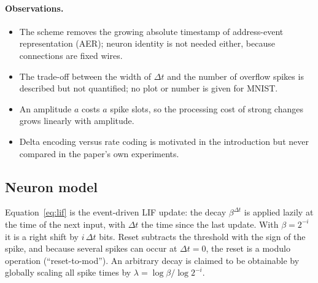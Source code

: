 \paragraph{Observations.}
\begin{itemize}[leftmargin=1.5em]
\item The scheme removes the growing absolute timestamp of address-event representation (AER); neuron identity is not needed either, because connections are fixed wires.
\item The trade-off between the width of $\Delta t$ and the number of overflow spikes is described but not quantified; no plot or number is given for MNIST.
\item An amplitude $a$ costs $a$ spike slots, so the processing cost of strong changes grows linearly with amplitude.
\item Delta encoding versus rate coding is motivated in the introduction but never compared in the paper's own experiments.
\end{itemize}

\subsection{Neuron model}
Equation~\eqref{eq:lif} is the event-driven LIF update: the decay $\beta^{\Delta t}$ is applied lazily at the time of the next input, with $\Delta t$ the time since the last update. With $\beta=2^{-i}$ it is a right shift by $i\,\Delta t$ bits. Reset subtracts the threshold with the sign of the spike, and because several spikes can occur at $\Delta t=0$, the reset is a modulo operation (``reset-to-mod''). An arbitrary decay is claimed to be obtainable by globally scaling all spike times by $\lambda=\log\beta/\log 2^{-i}$.

